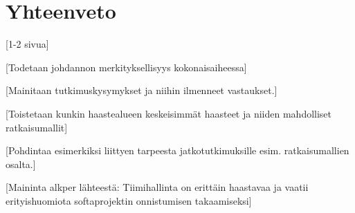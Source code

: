 \chapter{Yhteenveto\label{conclusions}}

[1-2 sivua]

[Todetaan johdannon merkityksellisyys kokonaisaiheessa]

[Mainitaan tutkimuskysymykset ja niihin ilmenneet vastaukset.]

[Toistetaan kunkin haastealueen keskeisimmät haasteet ja niiden mahdolliset ratkaisumallit]

[Pohdintaa esimerkiksi liittyen tarpeesta jatkotutkimuksille esim. ratkaisumallien osalta.]

[Maininta alkper lähteestä: Tiimihallinta on erittäin haastavaa ja vaatii erityishuomiota softaprojektin onnistumisen takaamiseksi]